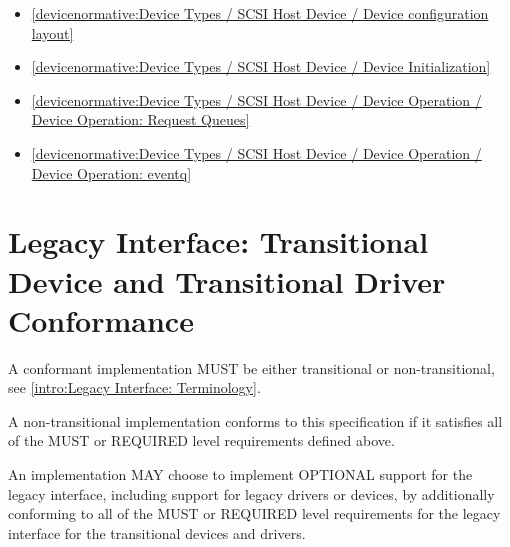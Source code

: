 \begin{itemize}
\item \ref{devicenormative:Device Types / SCSI Host Device / Device configuration layout}
\item \ref{devicenormative:Device Types / SCSI Host Device / Device Initialization}
\item \ref{devicenormative:Device Types / SCSI Host Device / Device Operation / Device Operation: Request Queues}
\item \ref{devicenormative:Device Types / SCSI Host Device / Device Operation / Device Operation: eventq}
\end{itemize}

\section{Legacy Interface: Transitional Device and
Transitional Driver Conformance}\label{sec:Conformance / Legacy
Interface: Transitional Device and 
Transitional Driver Conformance}
A conformant implementation MUST be either transitional or
non-transitional, see \ref{intro:Legacy
Interface: Terminology}.

A non-transitional implementation conforms to this specification
if it satisfies all of the MUST or REQUIRED level requirements
defined above.

An implementation MAY choose to implement OPTIONAL support for the
legacy interface, including support for legacy drivers
or devices, by additionally conforming to all of the MUST or
REQUIRED level requirements for the legacy interface
for the transitional devices and drivers.

